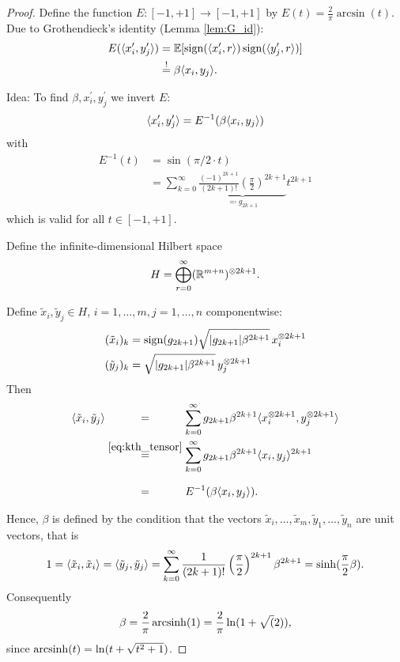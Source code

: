 	\begin{proof}
		Define the function $E: [-1,+1] \to [-1,+1]$ by $E(t)=\frac{2}{\pi}\arcsin(t)$. Due to Grothendieck's identity (Lemma \ref{lem:G_id}):
		\begin{align*}
			E(\langle{x_i^\prime},{y_j^\prime}\rangle ) &= \mathbb{E}[\operatorname{sign}(\langle{x_i^\prime},{r}\rangle)\operatorname{sign}(\langle{y_j^\prime},{r}\rangle)]\\
			&\overset{!}{=}\beta \langle{x_i},{y_j}\rangle.
		\end{align*}
		
		\noindent Idea: To find $\beta,x_i^\prime,y_j^\prime$ we invert $E$:
		\[
			\langle{x_i^\prime},{y_j^\prime}\rangle = E^{-1} (\beta \langle{x_i},{y_j}\rangle)	
		\]
		with 
		\begin{align*}
			E^{-1}(t) &= \sin(\pi/2 \cdot t) \\
			&= \sum_{k=0}^\infty \underbrace{\frac{(-1)^{2k+1}}{(2k+1)!}\left(\frac{\pi}{2}\right)^{2k+1}}_{\eqqcolon g_{2k+1}}  t^{2k+1}
		\end{align*}
		which is valid for all $t\in[-1,+1]$.
		
		Define the infinite-dimensional Hilbert space
		\begin{equation}
			H= \bigoplus_{r=0}^\infty (\mathbb{R}^{m+n})^{\otimes 2k+1}.
		\end{equation}
		
		Define $\tilde{x}_i, \tilde{y}_j\in H$, $i=1,\dots,m,j=1,\dots,n$ componentwise:
		\begin{align}
			(\tilde{x}_i)_k &= \operatorname{sign}(g_{2k+1}) \sqrt{{\left|{g_{2k+1}}\right|}\beta^{2k+1}}\, x_i^{\otimes 2k+1} \\
			(\tilde{y}_j)_k &= \sqrt{{\left|{g_{2k+1}}\right|}\beta^{2k+1}} \,y_j^{\otimes 2k+1}
		\end{align}
		Then 
		\begin{align*}
			\sclr{\tilde{x}_i}{\tilde{y}_j} &\overset{\textcolor{white}{\eqref*{eq:kth_tensor}}}{=} \sum_{k=0}^\infty g_{2k+1} \beta^{2k+1}\sclr{x_i^{\tensor 2k+1}}{y_j^{\tensor 2k+1}} \\
			&\overset{\eqref{eq:kth_tensor}}{=} \sum_{k=0}^\infty g_{2k+1} \beta^{2k+1} \sclr{x_i}{y_j}^{2k+1} \\
			&\overset{\textcolor{white}{\eqref*{eq:kth_tensor}}}{=} E^{-1}(\beta \sclr{x_i}{y_j}).
		\end{align*}
		
		Hence, $\beta$ is defined by the condition that the vectors $\tilde{x}_i,\dots,\tilde{x}_m,\tilde{y}_1,\dots,\tilde{y}_n$ are unit vectors, that is
		\[
			1 = \langle{\tilde{x}_i},{\tilde{x}_i}\rangle = \langle{\tilde{y}_j},{\tilde{y}_j}\rangle
			= \sum_{k=0}^\infty \frac{1}{(2k+1)!}\left(\frac{\pi}{2}\right)^{2k+1}\beta^{2k+1}=\sinh(\frac{\pi}{2}\beta).
		\]
		Consequently
		\[
			\beta = \frac{2}{\pi} \operatorname{arcsinh}(1) = \frac{2}{\pi}\ln(1+\sqrt(2)),	
		\]
		since $\operatorname{arcsinh} (t) = \ln(t+\sqrt{t^2+1})$.
	

\end{proof}
